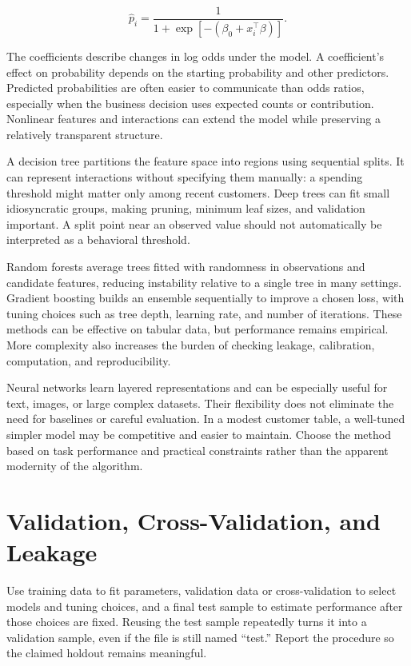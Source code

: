 \[
\hat p_i=\frac{1}{1+\exp[-(\beta_0+x_i^\top\beta)]}.
\]

The coefficients describe changes in log odds under the model. A
coefficient's effect on probability depends on the starting probability
and other predictors. Predicted probabilities are often easier to
communicate than odds ratios, especially when the business decision uses
expected counts or contribution. Nonlinear features and interactions can
extend the model while preserving a relatively transparent structure.

A decision tree partitions the feature space into regions using
sequential splits. It can represent interactions without specifying them
manually: a spending threshold might matter only among recent customers.
Deep trees can fit small idiosyncratic groups, making pruning, minimum
leaf sizes, and validation important. A split point near an observed
value should not automatically be interpreted as a behavioral threshold.

Random forests average trees fitted with randomness in observations and
candidate features, reducing instability relative to a single tree in
many settings. Gradient boosting builds an ensemble sequentially to
improve a chosen loss, with tuning choices such as tree depth, learning
rate, and number of iterations. These methods can be effective on
tabular data, but performance remains empirical. More complexity also
increases the burden of checking leakage, calibration, computation, and
reproducibility.

Neural networks learn layered representations and can be especially
useful for text, images, or large complex datasets. Their flexibility
does not eliminate the need for baselines or careful evaluation. In a
modest customer table, a well-tuned simpler model may be competitive and
easier to maintain. Choose the method based on task performance and
practical constraints rather than the apparent modernity of the
algorithm.

\hypertarget{M07-validation-cross-validation-and-leakage}{%
\section{Validation, Cross-Validation, and
Leakage}\label{M07-validation-cross-validation-and-leakage}}

\noindent Use training data to fit parameters, validation data or cross-validation
to select models and tuning choices, and a final test sample to estimate
performance after those choices are fixed. Reusing the test sample
repeatedly turns it into a validation sample, even if the file is still
named ``test.'' Report the procedure so the claimed holdout remains
meaningful.

